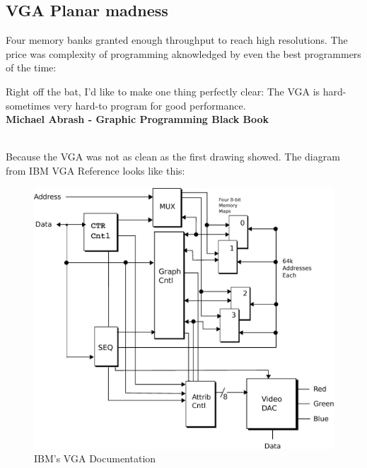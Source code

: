 \documentclass[book.tex]{subfiles}
\begin{document}
\subsection{VGA Planar madness}

Four memory banks granted enough throughput to reach high resolutions. The price was complexity of programming aknowledged by even the best programmers of the time:\\

 \begin{fancyquotes}
   Right off the bat, I'd like to make one thing perfectly clear: The VGA is hard-sometimes very hard-to program for good performance.
 \bigskip \\
\textbf{Michael Abrash - Graphic Programming Black Book}
 \end{fancyquotes}
 \\
Because the VGA was not as clean as the first drawing showed. The diagram from IBM VGA Reference looks like this:\\
 \begin{figure}[H]
\centering
\includegraphics[scale=0.38]{imgs/ibm_vga.eps}
%
\caption{IBM's VGA Documentation}
\label{fig:ibm_vga}
\end{figure}
\end{document}
